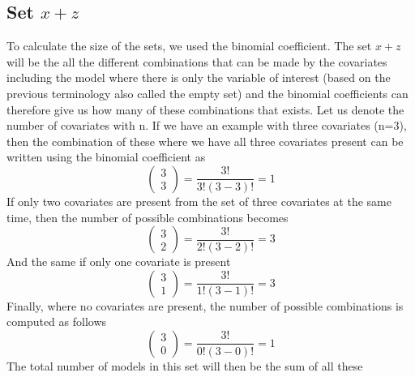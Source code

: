 \subsection{Set $x + z$}
To calculate the size of the sets, we used the binomial coefficient. The set $x + z$ will be the all the different combinations that can be made by the covariates including the model where there is only the variable of interest (based on the previous terminology also called the empty set) and the binomial coefficients can therefore give us how many of these combinations that exists. Let us denote the number of covariates with n. If we have an example with three covariates (n=3), then the combination of these where we have all three covariates present can be written using the binomial coefficient as
\[\left( \begin{array}{c}
3 \\ 
3 \end{array}
\right)=\frac{3!}{3!\left(3-3\right)!}=1\]
If only two covariates are present from the set of three covariates at the same time, then the number of possible combinations becomes 
\[\left( \begin{array}{c}
3 \\ 
2 \end{array}
\right)=\frac{3!}{2!\left(3-2\right)!}=3\] 
And the same if only one covariate is present
\[\left( \begin{array}{c}
3 \\ 
1 \end{array}
\right)=\frac{3!}{1!\left(3-1\right)!}=3\] 
Finally, where no covariates are present, the number of possible combinations is computed as follows
\[\left( \begin{array}{c}
3 \\ 
0 \end{array}
\right)=\frac{3!}{0!\left(3-0\right)!}=1\] 
The total number of models in this set will then be the sum of all these


